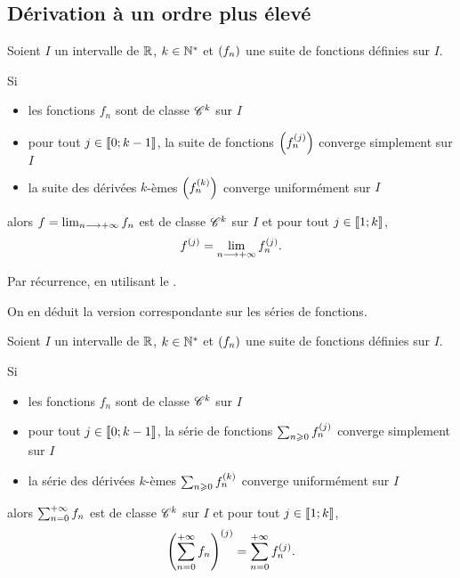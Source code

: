 \subsection{Dérivation à un ordre plus élevé}

\begin{theo}
Soient \(I\) un intervalle de \(\mathbb{R}\), \(k\in\mathbb{N}^*\) et \(\left(f_n\right)\) une suite de fonctions définies sur \(I\).

Si

\begin{itemize}
    \item les fonctions \(f_n\) sont de classe \(\mathscr{C}^{k}\) sur \(I\) \\
    \item pour tout \(j\in\left\llbracket0;k-1\right\rrbracket\), la suite de fonctions \(\left(f_n^{\left(j\right)}\right)\) converge simplement sur \(I\) \\
    \item la suite des dérivées \(k\)-èmes \(\left(f_n^{\left(k\right)}\right)\) converge uniformément sur \(I\)
\end{itemize}

alors \(f=\lim_{n\longrightarrow+\infty}f_n\) est de classe \(\mathscr{C}^{k}\) sur \(I\) et pour tout \(j\in\left\llbracket1;k\right\rrbracket\), \[f^{\left(j\right)}=\lim_{n\longrightarrow+\infty}f_n^{\left(j\right)}.\]
\end{theo}

\begin{dem}
Par récurrence, en utilisant le .
\end{dem}

On en déduit la version correspondante sur les séries de fonctions.

\begin{cor}
Soient \(I\) un intervalle de \(\mathbb{R}\), \(k\in\mathbb{N}^*\) et \(\left(f_n\right)\) une suite de fonctions définies sur \(I\).

Si

\begin{itemize}
    \item les fonctions \(f_n\) sont de classe \(\mathscr{C}^{k}\) sur \(I\) \\
    \item pour tout \(j\in\left\llbracket0;k-1\right\rrbracket\), la série de fonctions \(\sum_{n\geqslant0}f_n^{\left(j\right)}\) converge simplement sur \(I\) \\
    \item la série des dérivées \(k\)-èmes \(\sum_{n\geqslant0}f_n^{\left(k\right)}\) converge uniformément sur \(I\)
\end{itemize}

alors \(\sum_{n=0}^{+\infty}f_n\) est de classe \(\mathscr{C}^{k}\) sur \(I\) et pour tout \(j\in\left\llbracket1;k\right\rrbracket\), \[\left(\sum_{n=0}^{+\infty}f_n\right)^{\left(j\right)}=\sum_{n=0}^{+\infty}f_n^{\left(j\right)}.\]
\end{cor}

